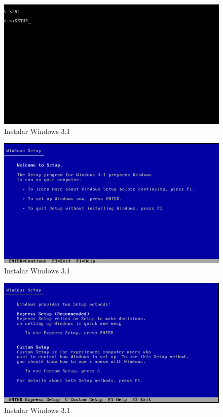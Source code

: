\documentclass{report}
\begin{document}
\begin{figure}
\centering
\includegraphics[width=\textwidth]{Screenshot_24.png}
\caption{Instalar Windows 3.1}
\label{fig:24}
\end{figure}

\begin{figure}
\centering
\includegraphics[width=\textwidth]{Screenshot_25.png}
\caption{Instalar Windows 3.1}
\label{fig:25}
\end{figure}

\begin{figure}
\centering
\includegraphics[width=\textwidth]{Screenshot_26.png}
\caption{Instalar Windows 3.1}
\label{fig:26}
\end{figure}
\end{document}
